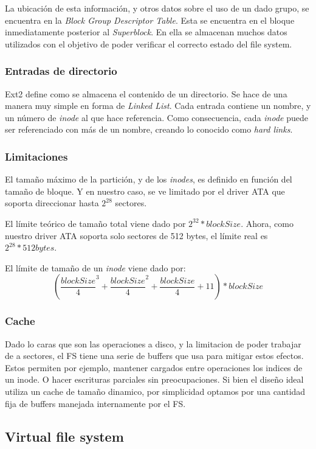 \documentclass[a4paper,10pt]{article}
\begin{document}
La ubicación de esta información, y otros datos sobre el uso de un dado grupo, se encuentra en la \textit{Block Group Descriptor Table}.
Esta se encuentra en el bloque inmediatamente posterior al \textit{Superblock}.
En ella se almacenan muchos datos utilizados con el objetivo de poder verificar el correcto estado del file system.

\subsubsection{Entradas de directorio}
Ext2 define como se almacena el contenido de un directorio.
Se hace de una manera muy simple en forma de \textit{Linked List}.
Cada entrada contiene un nombre, y un número de \textit{inode} al que hace referencia.
Como consecuencia, cada \textit{inode} puede ser referenciado con más de un nombre, creando lo conocido como \textit{hard links}.

\subsubsection{Limitaciones}
El tamaño máximo de la partición, y de los \textit{inodes}, es definido en función del tamaño de bloque.
Y en nuestro caso, se ve limitado por el driver ATA que soporta direccionar hasta $ 2^{28} $ sectores.

El límite teórico de tamaño total viene dado por $ 2^{32} * blockSize $.
Ahora, como nuestro driver ATA soporta solo sectores de 512 bytes, el límite real es $ 2^{28} * 512 bytes $.

El límite de tamaño de un \textit{inode} viene dado por:
$$( \frac{blockSize}{4}^3 + \frac{blockSize}{4}^2 + \frac{blockSize}{4} + 11 ) * blockSize $$

\subsubsection{Cache}
Dado lo caras que son las operaciones a disco, y la limitacion de poder trabajar de a sectores, el FS tiene una serie de buffers que usa para mitigar estos efectos.
Estos permiten por ejemplo, mantener cargados entre operaciones los indices de un inode.
O hacer escrituras parciales sin preocupaciones.
Si bien el diseño ideal utiliza un cache de tamaño dinamico, por simplicidad optamos por una cantidad fija de buffers manejada internamente por el FS.

\subsection{Virtual file system}
\end{document}
